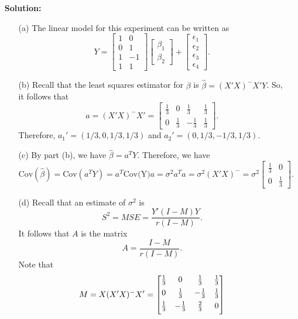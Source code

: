 \documentclass[11pt]{article}
\begin{document}
\begin{itemize}
\item[] {\bf Solution:}
\begin{itemize}
\item[(a)]  The linear model for this experiment can be written as
\[
Y = \begin{bmatrix}
1 & 0 \\
0 & 1 \\
1 & -1 \\
1 & 1
\end{bmatrix} \begin{bmatrix}
\beta_1 \\ \beta_2
\end{bmatrix} + \begin{bmatrix}
\epsilon_1 \\ \epsilon_2 \\ \epsilon_3 \\ \epsilon_4
\end{bmatrix}.
\]
\item[(b)]  Recall that the least squares estimator for $\beta$ is $\widehat{\beta} = (X'X)^-X'Y$.  So, it follows that
\[
a = (X'X)^-X' = \begin{bmatrix}
\frac{1}{3} & 0 & \frac{1}{3} & \frac{1}{3} \\
0 & \frac{1}{3} & -\frac{1}{3} & \frac{1}{3}
\end{bmatrix}.
\]
Therefore, $a_1' = (1/3, 0, 1/3, 1/3)$ and $a_2' = (0, 1/3, -1/3, 1/3)$.
\item[(c)]  By part (b), we have $\widehat{\beta} = a^TY$.  Therefore, we have
\[
\text{Cov}(\widehat{\beta}) = \text{Cov}(a^TY) = a^T\text{Cov(Y)}a = \sigma^2a^Ta = \sigma^2(X'X)^- = \sigma^2\begin{bmatrix}
\frac{1}{3} & 0 \\
0 & \frac{1}{3}
\end{bmatrix}.
\]
\item[(d)] Recall that an estimate of $\sigma^2$ is
\[
S^2 = MSE = \frac{Y'(I-M)Y}{r(I-M)}.
\]
It follows that $A$ is the matrix
\[
A = \frac{I-M}{r(I-M)}.
\]
Note that
\[
M = X(X'X)^-X' = \begin{bmatrix}
\frac{1}{3} & 0 & \frac{1}{3} \vspace{1.5mm}& \frac{1}{3} \\
0 & \frac{1}{3} & -\frac{1}{3} \vspace{1.5mm}& \frac{1}{3} \\
\frac{1}{3} &  -\frac{1}{3} \vspace{1.5mm}& \frac{2}{3} & 0 \\

\end{bmatrix}\]
\end{itemize}
\end{itemize}
\end{document}
